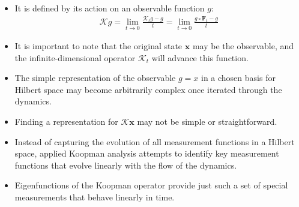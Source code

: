 \documentclass[hyperref={pdfpagemode=FullScreen},aspectratio=169]{beamer}
\begin{document}
\begin{frame}{}
\begin{itemize}
\setlength\itemsep{1em}
\item It is defined by its action on an observable function $g$:
\begin{align}
\mathcal{K}g = \lim_{t \to 0} \frac{\mathcal{K}_t g - g}{t} = \lim_{t \to 0} \frac{g \circ \mathbf{F}_t - g}{t}
\end{align} 
\item It is important to note that the original state $\mathbf{x}$ may be the observable, and the infinite-dimensional operator $\mathcal{K}_t$ will advance this function.
\item The simple representation of the observable $g = x$ in a chosen basis for Hilbert space may become arbitrarily complex once iterated through the dynamics.
\item Finding a representation for $\mathcal{K}\mathbf{x}$ may not be simple or straightforward.
\item Instead of capturing the evolution of all measurement functions in a Hilbert space, applied Koopman analysis attempts to identify key measurement functions that evolve linearly with the flow of the dynamics.
\item Eigenfunctions of the Koopman operator provide just such a set of special measurements that behave linearly in time.
\end{itemize}
\end{frame}
\end{document}
